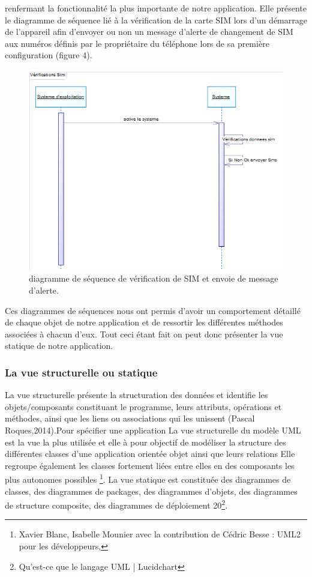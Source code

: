 \documentclass[a4paper, 12pt]{article}
\begin{document}
 renfermant la fonctionnalité la plus importante de notre application. Elle présente le diagramme de séquence
lié à la vérification de la carte SIM lors d’un démarrage de l’appareil afin d’envoyer ou non un message d’alerte de changement de SIM aux numéros définis par le propriétaire du téléphone lors de sa première configuration (figure 4).\\



\begin{figure}[htp]
\begin{center}
\includegraphics[scale=0.5]{image1.png}
\end{center}
\caption{diagramme de séquence de vérification de SIM et envoie de message d’alerte.}
\end{figure}


Ces diagrammes de séquences nous ont permis d’avoir un comportement détaillé de chaque objet de notre application et de ressortir les différentes méthodes associées à chacun d’eux. Tout ceci étant fait on peut donc présenter la vue statique de notre application.

\subsubsection{La vue structurelle ou statique}
\quad La vue structurelle présente la structuration des données et identifie les objets/composants constituant le programme, leurs attributs, opérations et méthodes, ainsi que les liens ou associations qui les unissent (Pascal Roques,2014).Pour spécifier une application La vue structurelle du modèle UML est la vue la plus utilisée  et elle à pour objectif de modéliser la structure des différentes classes d’une application orientée objet ainsi que leurs relations Elle regroupe également les classes fortement liées entre elles en des composants les plus autonomes possibles \footnote{Xavier Blanc, Isabelle Mounier avec la contribution de Cédric Besse : UML2 pour les développeurs,}. La vue statique est constituée des diagrammes de classes, des diagrammes de packages, des diagrammes d’objets, des diagrammes de structure composite, des diagrammes de déploiement 20\footnote{Qu'est-ce que le langage UML | Lucidchart}.
\end{document}
